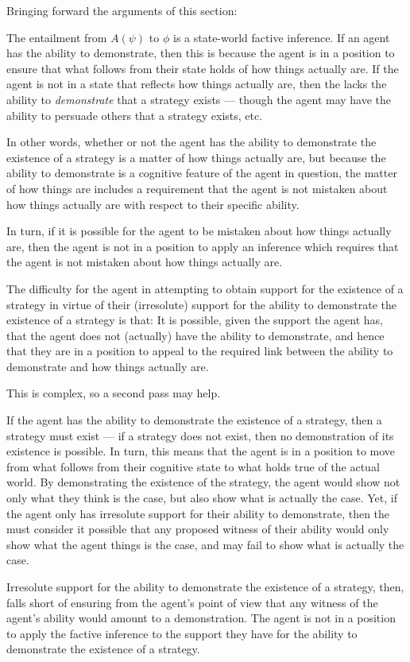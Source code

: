 \documentclass[10pt]{article}
\begin{document}
\begin{note}
  Bringing forward the arguments of this section:

  The entailment from \(A(\psi)\) to \(\phi\) is a state-world factive inference.
  If an agent has the ability to demonstrate, then this is because the agent is in a position to ensure that what follows from their state holds of how things actually are.
  If the agent is not in a state that reflects how things actually are, then the lacks the ability to \emph{demonstrate} that a strategy exists --- though the agent may have the ability to persuade others that a strategy exists, etc.

  In other words, whether or not the agent has the ability to demonstrate the existence of a strategy is a matter of how things actually are, but because the ability to demonstrate is a cognitive feature of the agent in question, the matter of how things are includes a requirement that the agent is not mistaken about how things actually are with respect to their specific ability.

  In turn, if it is possible for the agent to be mistaken about how things actually are, then the agent is not in a position to apply an inference which requires that the agent is not mistaken about how things actually are.

  The difficulty for the agent in attempting to obtain support for the existence of a strategy in virtue of their (irresolute) support for the ability to demonstrate the existence of a strategy is that:
  It is possible, given the support the agent has, that the agent does not (actually) have the ability to demonstrate, and hence that they are in a position to appeal to the required link between the ability to demonstrate and how things actually are.
\end{note}

\begin{note}
  This is complex, so a second pass may help.

  If the agent has the ability to demonstrate the existence of a strategy, then a strategy must exist --- if a strategy does not exist, then no demonstration of its existence is possible.
  In turn, this means that the agent is in a position to move from what follows from their cognitive state to what holds true of the actual world.
  By demonstrating the existence of the strategy, the agent would show not only what they think is the case, but also show what is actually the case.
  Yet, if the agent only has irresolute support for their ability to demonstrate, then the must consider it possible that any proposed witness of their ability would only show what the agent things is the case, and may fail to show what is actually the case.

  Irresolute support for the ability to demonstrate the existence of a strategy, then, falls short of ensuring from the agent's point of view that any witness of the agent's ability would amount to a demonstration.
  The agent is not in a position to apply the factive inference to the support they have for the ability to demonstrate the existence of a strategy.
\end{note}
\end{document}
